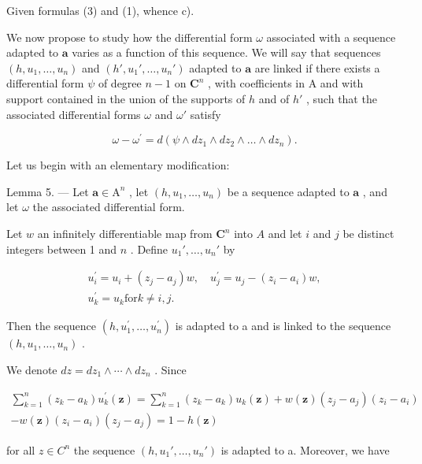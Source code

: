 Given formulas (3) and (1), whence c).

We now propose to study how the differential form \(\omega\) associated with a sequence adapted to \(\boldsymbol{a}\) varies as a function of this sequence. We will say that sequences \((h, u_1, \ldots, u_n)\) and \((h', u_1', \ldots, u_n')\) adapted to \(\boldsymbol{a}\) are linked if there exists a differential form \(\psi\) of degree \(n-1\) on \(\mathbf{C}^n\) , with coefficients in A and with support contained in the union of the supports of \(h\) and of \(h'\) , such that the associated differential forms \(\omega\) and \(\omega'\) satisfy

\[
\omega - \omega^ {\prime} = d (\psi \wedge d z _ {1} \wedge d z _ {2} \wedge \dots \wedge d z _ {n}).
\]

Let us begin with an elementary modification:

Lemma 5. --- Let \(\boldsymbol{a} \in \mathrm{A}^{n}\) , let \((h, u_{1}, \ldots, u_{n})\) be a sequence adapted to \(\boldsymbol{a}\) , and let \(\omega\) the associated differential form.

Let \(w\) an infinitely differentiable map from \(\mathbf{C}^n\) into \(A\) and let \(i\) and \(j\) be distinct integers between 1 and \(n\) . Define \(u_1', \ldots, u_n'\) by

\[
\begin{array}{c} u _ {i} ^ {\prime} = u _ {i} + (z _ {j} - a _ {j}) w, \quad u _ {j} ^ {\prime} = u _ {j} - (z _ {i} - a _ {i}) w, \\ u _ {k} ^ {\prime} = u _ {k} \text {for} k \neq i, j. \end{array}
\]

Then the sequence \((h,u_{1}^{\prime},\ldots,u_{n}^{\prime})\) is adapted to a and is linked to the sequence \((h,u_{1},\ldots,u_{n})\) .

We denote \(dz = dz_{1} \wedge \cdots \wedge dz_{n}\) . Since

\[
\begin{array}{c} \sum_ {k = 1} ^ {n} (z _ {k} - a _ {k}) u _ {k} ^ {\prime} (\boldsymbol {z}) = \sum_ {k = 1} ^ {n} (z _ {k} - a _ {k}) u _ {k} (\boldsymbol {z}) + w (\boldsymbol {z}) (z _ {j} - a _ {j}) (z _ {i} - a _ {i}) \\ - w (\boldsymbol {z}) (z _ {i} - a _ {i}) (z _ {j} - a _ {j}) = 1 - h (\boldsymbol {z}) \end{array}
\]

for all \(z \in C^{n}\) the sequence \((h, u_{1}', \ldots, u_{n}')\) is adapted to a. Moreover, we have

